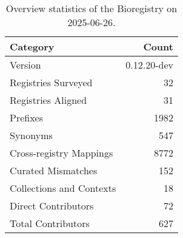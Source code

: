 \begin{table}
\caption{Overview statistics of the Bioregistry on 2025-06-26.}
\label{tab:bioregistry-summary}
\begin{tabular}{lr}
\toprule
Category & Count \\
\midrule
Version & 0.12.20-dev \\
Registries Surveyed & 32 \\
Registries Aligned & 31 \\
Prefixes & 1982 \\
Synonyms & 547 \\
Cross-registry Mappings & 8772 \\
Curated Mismatches & 152 \\
Collections and Contexts & 18 \\
Direct Contributors & 72 \\
Total Contributors & 627 \\
\bottomrule
\end{tabular}
\end{table}
